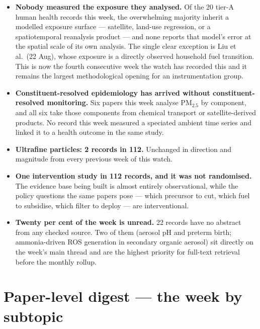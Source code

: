 \documentclass[10pt]{article}
\begin{document}
\footnotesize
\begin{itemize}
\item \textbf{Nobody measured the exposure they analysed.} Of the 20 tier-A human health
records this week, the overwhelming majority inherit a modelled exposure surface ---
satellite, land-use regression, or a spatiotemporal reanalysis product --- and none reports
that model's error at the spatial scale of its own analysis. The single clear exception is
Liu et al.\ (22 Aug), whose exposure is a directly observed household fuel transition.
This is now the fourth consecutive week the watch has recorded this and it remains the
largest methodological opening for an instrumentation group.

\item \textbf{Constituent-resolved epidemiology has arrived without
constituent-resolved monitoring.} Six papers this week analyse PM$_{2.5}$ by component,
and all six take those components from chemical transport or satellite-derived products.
No record this week measured a speciated ambient time series and linked it to a health
outcome in the same study.

\item \textbf{Ultrafine particles: 2 records in 112.} Unchanged in direction and
magnitude from every previous week of this watch.

\item \textbf{One intervention study in 112 records, and it was not randomised.} The
evidence base being built is almost entirely observational, while the policy questions the
same papers pose --- which precursor to cut, which fuel to subsidise, which filter to
deploy --- are interventional.

\item \textbf{Twenty per cent of the week is unread.} 22 records have no abstract from any
checked source. Two of them (aerosol pH and preterm birth; ammonia-driven ROS generation
in secondary organic aerosol) sit directly on the week's main thread and are the highest
priority for full-text retrieval before the monthly rollup.
\end{itemize}

\clearpage

\section*{\sffamily\bfseries\color{Deep}Paper-level digest --- the week by subtopic}
\vspace{-1.5mm}{\color{Teal}\rule{\linewidth}{1.1pt}}\vspace{1mm}
\end{document}
